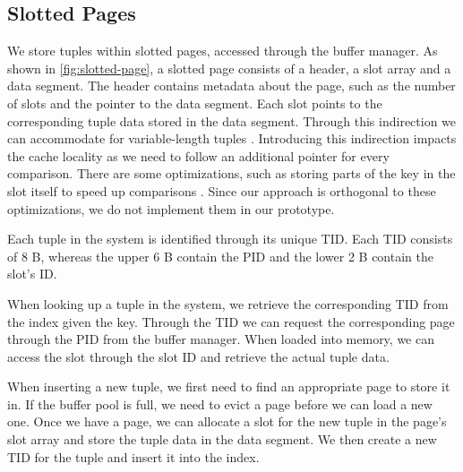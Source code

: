 \subsection*{Slotted Pages}

We store tuples within slotted pages, accessed through the buffer manager.
As shown in \autoref{fig:slotted-page}, a slotted page consists of a header, a slot array and a data segment.
The header contains metadata about the page, such as the number of slots and the pointer to the data segment.
Each slot points to the corresponding tuple data stored in the data segment.
Through this indirection we can accommodate for variable-length tuples \cite{mdbs2024slides}.
Introducing this indirection impacts the cache locality as we need to follow an additional pointer for every comparison.
There are some optimizations, such as storing parts of the key in the slot itself to speed up comparisons \cite{graefe2014memory}.
Since our approach is orthogonal to these optimizations, we do not implement them in our prototype.

Each tuple in the system is identified through its unique \ac{TID}.
Each \ac{TID} consists of 8 B, whereas the upper 6 B contain the \ac{PID} and the lower 2 B contain the slot's ID.

When looking up a tuple in the system, we retrieve the corresponding \ac{TID} from the index given the key.
Through the \ac{TID} we can request the corresponding page through the \ac{PID} from the buffer manager.
When loaded into memory, we can access the slot through the slot ID and retrieve the actual tuple data.

When inserting a new tuple, we first need to find an appropriate page to store it in.
If the buffer pool is full, we need to evict a page before we can load a new one.
Once we have a page, we can allocate a slot for the new tuple in the page's slot array and store the tuple data in the data segment.
We then create a new \ac{TID} for the tuple and insert it into the index.

